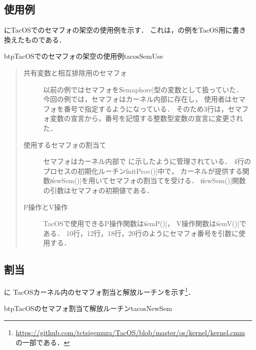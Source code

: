 \subsection{使用例}
にTacOSでのセマフォの架空の使用例を示す．
これは，の例をTacOS用に書き換えたものである．

\begin{myfig}{btp}{TacOSでのセマフォの架空の使用例}{tacosSemUse}

\end{myfig}

\begin{quote}
\begin{description}
\item [共有変数と相互排除用のセマフォ]
以前の例ではセマフォを\|Semaphore|型の変数として扱っていた．
今回の例では，セマフォはカーネル内部に存在し，
使用者はセマフォを番号で指定するようになっている．
そのため3行は，セマフォ変数の宣言から，番号を記憶する整数型変数の宣言に変更された．

\item [使用するセマフォの割当て]
セマフォはカーネル内部で
に示したように管理されている．
4行のプロセスの初期化ルーチン\|initProc()|中で，
カーネルが提供する関数\|newSem()|を用いてセマフォの割当てを受ける．
\|newSem()|関数の引数はセマフォの初期値である．

\item [P操作とV操作]
TacOSで使用できるP操作関数は\|semP()|，
V操作関数は\|semV()|である．
10行，12行，18行，20行のようにセマフォ番号を引数に使用する．
\end{description}
\end{quote}

\subsection{割当}
に
TacOSカーネル内のセマフォ割当と解放ルーチンを示す\footnote{
\url{https://github.com/tctsigemura/TacOS/blob/master/os/kernel/kernel.cmm}
の一部である．}．

\begin{myfig}{btp}{TacOSのセマフォ割当て解放ルーチン}{tacosNewSem}

\end{myfig}

